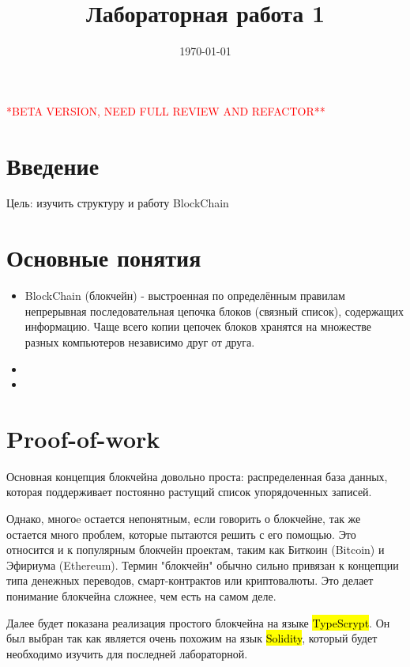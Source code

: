 \documentclass{article}
\begin{document}
	

\textcolor{red}{{\huge **BETA VERSION, NEED FULL REVIEW AND REFACTOR**}}
	
\title{Лабораторная работа 1}

\date{\today}
\maketitle


\section{Введение}

Цель: изучить структуру и работу BlockChain


\section{Основные понятия}


\begin{itemize}
	\item BlockChain (блокчейн) - выстроенная по определённым правилам непрерывная последовательная цепочка блоков (связный список), содержащих информацию. Чаще всего копии цепочек блоков хранятся на множестве разных компьютеров независимо друг от друга. 
	\item 
	\item 	
\end{itemize}


\section{Proof-of-work}

Основная концепция блокчейна довольно проста: распределенная база данных, которая поддерживает постоянно растущий список упорядоченных записей. 

Однако, многоe остается непонятным, если говорить о блокчейне, так же остается много проблем, которые пытаются решить с его помощью. Это относится и к популярным блокчейн проектам, таким как Биткоин (Bitcoin) и Эфириума (Ethereum). Термин "блокчейн" обычно сильно привязан к концепции типа денежных переводов, смарт-контрактов или криптовалюты. Это делает понимание блокчейна сложнее, чем есть на самом деле.

Далее будет показана реализация простого блокчейна на языке  \hl{TypeScrypt}. Он был выбран так как является очень похожим на язык \hl{Solidity}, который будет необходимо изучить для последней лабораторной.
\end{document}
